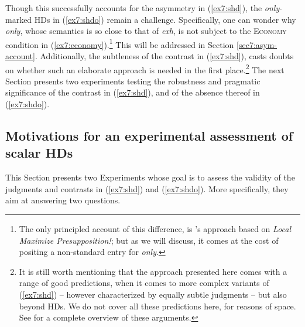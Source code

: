 Though this successfully accounts for the asymmetry in (\ref{ex7:shd}), the \textit{only}-marked HDs in (\ref{ex7:shdo}) remain a challenge. Specifically, one can wonder why \textit{only}, whose semantics is so close to that of \textit{exh}, is not subject to the \textsc{Economy} condition in (\ref{ex7:economy}).\footnote{The only principled account of this difference, is \citet{Singh2008b}'s approach based on \textit{Local Maximize Presupposition!}; but as we will discuss, it comes at the cost of positing a non-standard entry for \textit{only}.} This will be addressed in Section \ref{sec7:asym-account}. Additionally, the subtleness of the contrast in (\ref{ex7:shd}), casts doubts on whether such an elaborate approach is needed in the first place.\footnote{It is still worth mentioning that the approach presented here comes with a range of good predictions, when it comes to more complex variants of (\ref{ex7:shd}) -- however characterized by equally subtle judgments -- but also beyond HDs. We do not cover all these predictions here, for reasons of space. See \citet{Fox2018} for a complete overview of these arguments.} The next Section presents two experiments testing the robustness and pragmatic significance of the contrast in (\ref{ex7:shd}), and of the absence thereof in (\ref{ex7:shdo}).

\subsection{Motivations for an experimental assessment of scalar HDs}
This Section presents two Experiments whose goal is to assess the validity of the judgments and contrasts in (\ref{ex7:shd}) and (\ref{ex7:shdo}). More specifically, they aim at answering two questions.

